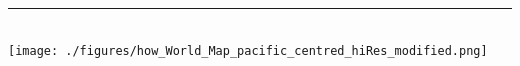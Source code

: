\documentclass[landscape,DIV=18,a3paper,10pt]{article}
\newcommand{\answer}[2][0.125]{
\ifbool{showAll}{%
\underline{\parbox{#1\linewidth}{\color{myGreen}\centering #2}}}
{%
\underline{\tikz{\useasboundingbox (0,0)--+(#1\linewidth,0);}}}
}
\newcommand{\ru}[1]{\rule{#1}{1pt}}
\def\br{\\[10pt]}
\begin{document}
\vspace{1cm}
\rule{1.1\linewidth}{1pt}\\

\texttt{[image: ./figures/how\_World\_Map\_pacific\_centred\_hiRes\_modified.png]}

\restoregeometry

\twocolumn
%
%
%
%
%
%
%
%
\end{document}
